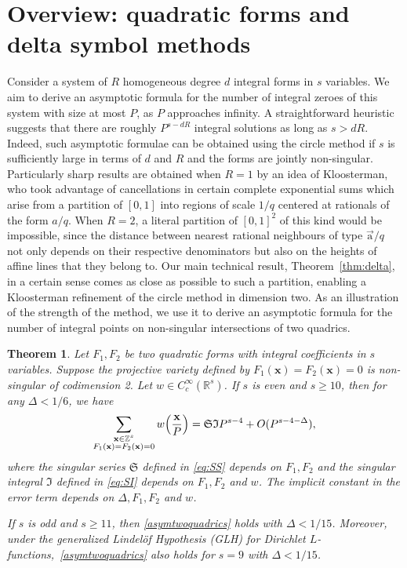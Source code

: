 \documentclass[letterpaper,11pt]{amsart}
\numberwithin{equation}{section}
\newtheorem{theorem}{Theorem}[section]
\theoremstyle{definition}
\numberwithin{equation}{section}
\newcommand{\ZZ}{\mathbb{Z}}
\newcommand{\RR}{\mathbb{R}}
\newcommand{\x}{\mathbf{x}}
\newcommand{\ua}{\vec{\mathrm{a}}}
\begin{document}
\section{Overview: quadratic forms and delta symbol methods}\label{sec:delta}
Consider a system of $R$ homogeneous degree $d$ integral forms in $s$ variables. We aim to derive an asymptotic formula for the number of integral zeroes of this system with size at most $P$, as $P$ approaches infinity. A straightforward heuristic suggests that there are roughly $P^{s-dR}$ integral solutions as long as $s>dR$. Indeed, such asymptotic formulae can be obtained using the circle method if $s$ is sufficiently large in terms of $d$ and $R$ and the forms are jointly non-singular.
Particularly sharp results are obtained when $R=1$ by an idea of Kloosterman, who took advantage of cancellations in certain complete exponential sums which arise from a
partition of $[0,1]$ into regions of scale $1/q$ centered at rationals of the form $a/q$.
 When $R=2$, a literal partition of $[0,1]^2$ of this kind would be impossible, since the distance between nearest rational neighbours of type $\ua/q$  not only depends on their respective denominators but also on the heights of affine lines that they belong to.
Our main technical result, Theorem~\ref{thm:delta}, in a certain sense comes as close as possible to such a partition, enabling a Kloosterman refinement of the circle method in dimension two. As an illustration of the strength of the method, we use it to derive an asymptotic formula for the number of integral points on non-singular intersections of two quadrics.

 \begin{theorem}\label{thm:application}
 	Let $F_1, F_2$ be two quadratic forms with integral coefficients in $s$ variables. 
    Suppose the projective variety defined by $F_1(\x)=F_2(\x)=0$ is non-singular of codimension 2. Let $w\in C_c^\infty (\RR^s)$. If $s$ is even and $s\geq10$, then for any $\Delta< 1/6$, we have 
 	\begin{align}\label{asymtwoquadrics}
 \operatornamewithlimits{\sum}_{\substack{\x\in \ZZ^s\\ F_1(\x)=F_2(\x)=0}}w\Big(\frac{\x}{P}\Big)=\mathfrak S \mathfrak I P^{s-4}+O(P^{s-4-\Delta}),
 	\end{align} 
 	where the singular series $\mathfrak S$ defined in \eqref{eq:SS} depends on $F_1, F_2$ and the singular integral $\mathfrak I$ defined in \eqref{eq:SI} depends on $F_1, F_2$ and $w$. The implicit constant in the error term depends on \(\Delta,F_1,F_2\) and \(w\).
    
    If $s$ is odd and $s\geq 11$, then \eqref{asymtwoquadrics} holds with $\Delta<1/15$. 
    Moreover, under the generalized Lindel\"of
    Hypothesis (GLH) for Dirichlet $L$-functions,~\eqref{asymtwoquadrics} also holds for $s=9$ with $\Delta<1/15$.
 \end{theorem}
\end{document}
